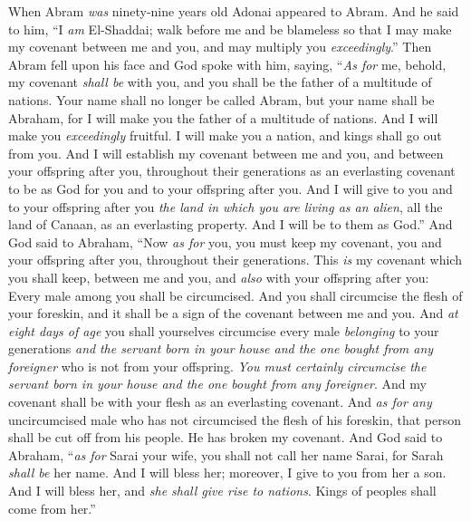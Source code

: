 \begin{biblechapter} %
 When Abram \textit{was} ninety-nine years old Adonai appeared to Abram. And he said to him, “I \textit{am} El-Shaddai; walk before me and be blameless
\verse so that I may make my covenant between me and you, and may multiply you \textit{exceedingly}.”
\verse Then Abram fell upon his face and God spoke with him, saying,
\verse “\textit{As for} me, behold, my covenant \textit{shall be} with you, and you shall be the father of a multitude of nations.
\verse Your name shall no longer be called Abram, but your name shall be Abraham, for I will make you the father of a multitude of nations.
\verse And I will make you \textit{exceedingly} fruitful. I will make you a nation, and kings shall go out from you.
\verse And I will establish my covenant between me and you, and between your offspring after you, throughout their generations as an everlasting covenant to be as God for you and to your offspring after you.
\verse And I will give to you and to your offspring after you \textit{the land in which you are living as an alien}, all the land of Canaan, as an everlasting property. And I will be to them as God.”
\verse And God said to Abraham, “Now \textit{as for} you, you must keep my covenant, you and your offspring after you, throughout their generations.
\verse This \textit{is} my covenant which you shall keep, between me and you, and \textit{also} with your offspring after you: Every male among you shall be circumcised.
\verse And you shall circumcise the flesh of your foreskin, and it shall be a sign of the covenant between me and you.
\verse And \textit{at eight days of age} you shall yourselves circumcise every male \textit{belonging} to your generations \textit{and} \textit{the servant born in your house and the one bought from any foreigner} who is not from your offspring.
\verse \textit{You must certainly circumcise} \textit{the servant born in your house and the one bought from any foreigner}. And my covenant shall be with your flesh as an everlasting covenant.
\verse And \textit{as for any} uncircumcised male who has not circumcised the flesh of his foreskin, that person shall be cut off from his people. He has broken my covenant.
\verse And God said to Abraham, “\textit{as for} Sarai your wife, you shall not call her name Sarai, for Sarah \textit{shall be} her name.
\verse And I will bless her; moreover, I give to you from her a son. And I will bless her, and \textit{she shall give rise to nations}. Kings of peoples shall come from her.”

\end{biblechapter}
